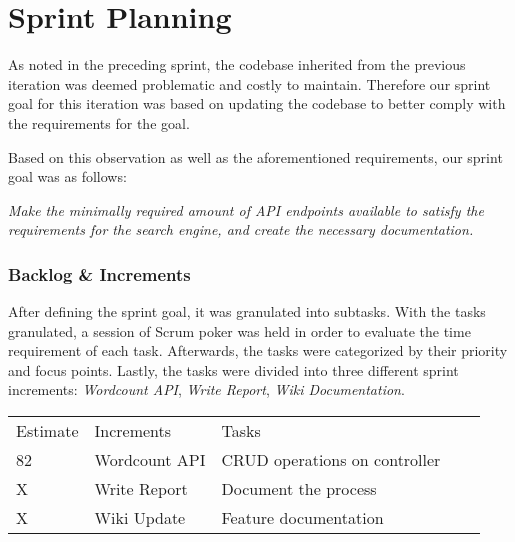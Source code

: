 \section{Sprint Planning}
As noted in the preceding sprint, the codebase inherited from the previous iteration was deemed problematic and costly to maintain. 
Therefore our sprint goal for this iteration was based on updating the codebase to better comply with the requirements for the \knox{} goal.


Based on this observation as well as the aforementioned requirements, our sprint goal was as follows:
\vspace{\baselineskip}

\textit{Make the minimally required amount of API endpoints available to satisfy the requirements for the search engine, and create the necessary documentation.}

\subsubsection{Backlog \& Increments}
After defining the sprint goal, it was granulated into subtasks. 
With the tasks granulated, a session of Scrum poker was held in order to evaluate the time requirement of each task. 
Afterwards, the tasks were categorized by their priority and focus points.
Lastly, the tasks were divided into three different sprint increments: \textit{Wordcount API}, \textit{Write Report}, \textit{Wiki Documentation}. 


\begin{table}[]
\begin{tabular}{|l|l|l|ll}
\cline{1-3}
Estimate & Increments                         & Tasks                         &  &  \\ \cline{1-3}
82       & \multicolumn{1}{c|}{Wordcount API} & CRUD operations on controller &  &  \\ \cline{1-3}
X        & Write Report                       & Document the process          &  &  \\ \cline{1-3}
X        & Wiki Update                        & Feature documentation         &  &  \\ \cline{1-3}
\end{tabular}
\end{table}





